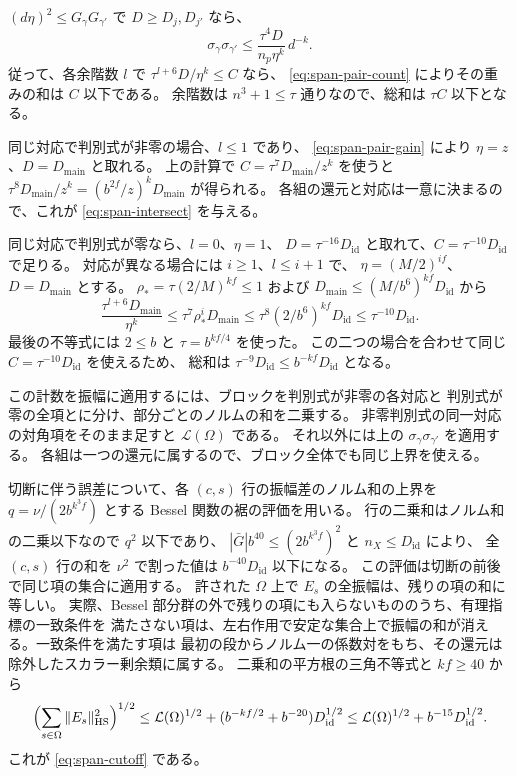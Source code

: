 \((d\eta)^2\le G_\gamma G_{\gamma'}\) で \(D\ge D_j,D_{j'}\) なら、
\[
 \sigma_\gamma\sigma_{\gamma'}
 \le \frac{\tau^4D}{n_p\eta^k}\,d^{-k}.
\]
従って、各余階数 \(l\) で \(\tau^{l+6}D/\eta^k\le C\) なら、
\eqref{eq:span-pair-count} によりその重みの和は \(C\) 以下である。
余階数は \(n^3+1\le\tau\) 通りなので、総和は \(\tau C\) 以下となる。

同じ対応で判別式が非零の場合、\(l\le1\) であり、
\eqref{eq:span-pair-gain} により \(\eta=z\)、\(D=D_{\mathrm{main}}\) と取れる。
上の計算で \(C=\tau^7D_{\mathrm{main}}/z^k\) を使うと
\(\tau^8 D_{\mathrm{main}}/z^k=(b^{2f}/z)^kD_{\mathrm{main}}\) が得られる。
各組の還元と対応は一意に決まるので、これが \eqref{eq:span-intersect} を与える。

同じ対応で判別式が零なら、\(l=0\)、\(\eta=1\)、
\(D=\tau^{-16}D_{\mathrm{id}}\) と取れて、\(C=\tau^{-10}D_{\mathrm{id}}\) で足りる。
対応が異なる場合には \(i\ge1\)、\(l\le i+1\) で、
\(\eta=(M/2)^{if}\)、\(D=D_{\mathrm{main}}\) とする。
\(\rho_\ast=\tau(2/M)^{kf}\le1\) および
\(D_{\mathrm{main}}\le(M/b^6)^{kf}D_{\mathrm{id}}\) から
\[
 \frac{\tau^{l+6}D_{\mathrm{main}}}{\eta^k}
 \le \tau^7\rho_\ast^iD_{\mathrm{main}}
 \le \tau^8(2/b^6)^{kf}D_{\mathrm{id}}
 \le \tau^{-10}D_{\mathrm{id}} .
\]
最後の不等式には \(2\le b\) と \(\tau=b^{kf/4}\) を使った。
この二つの場合を合わせて同じ \(C=\tau^{-10}D_{\mathrm{id}}\) を使えるため、
総和は \(\tau^{-9}D_{\mathrm{id}}\le b^{-kf}D_{\mathrm{id}}\) となる。

この計数を振幅に適用するには、ブロックを判別式が非零の各対応と
判別式が零の全項とに分け、部分ごとのノルムの和を二乗する。
非零判別式の同一対応の対角項をそのまま足すと \(\mathcal L(\Omega)\) である。
それ以外には上の \(\sigma_\gamma\sigma_{\gamma'}\) を適用する。
各組は一つの還元に属するので、ブロック全体でも同じ上界を使える。

切断に伴う誤差について、各 \((c,s)\) 行の振幅差のノルム和の上界を
\(q=\nu/(2b^{k^3 f})\) とする Bessel 関数の裾の評価を用いる。
行の二乗和はノルム和の二乗以下なので \(q^2\) 以下であり、
\(|\bar G|b^{40}\le(2b^{k^3 f})^2\) と \(n_X\le D_{\mathrm{id}}\) により、
全 \((c,s)\) 行の和を \(\nu^2\) で割った値は \(b^{-40}D_{\mathrm{id}}\) 以下になる。
この評価は切断の前後で同じ項の集合に適用する。
許された \(\Omega\) 上で \(E_s\) の全振幅は、残りの項の和に等しい。
実際、Bessel 部分群の外で残りの項にも入らないもののうち、有理指標の一致条件を
満たさない項は、左右作用で安定な集合上で振幅の和が消える。一致条件を満たす項は
最初の段からノルム一の係数対をもち、その還元は除外したスカラー剰余類に属する。
二乗和の平方根の三角不等式と \(kf\ge40\) から
\[
 \Bigl(\sum_{s\in\Omega}\|E_s\|_{\mathrm{HS}}^2\Bigr)^{1/2}
 \le \mathcal L(\Omega)^{1/2}
       +(b^{-kf/2}+b^{-20})D_{\mathrm{id}}^{1/2}
 \le \mathcal L(\Omega)^{1/2}+b^{-15}D_{\mathrm{id}}^{1/2}.
\]
これが \eqref{eq:span-cutoff} である。

